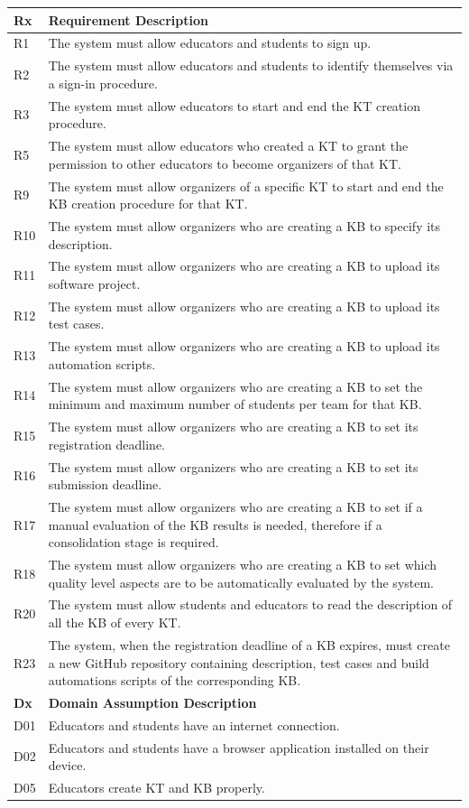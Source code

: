 \documentclass[11pt]{report}
\begin{document}
\begin{longtable}[h] {|p{10mm} p{130mm}|}
\hline
\textbf{Rx} & \textbf{Requirement Description} \\ \hline
R1 & The system must allow educators and students to sign up. \\
R2 & The system must allow educators and students to identify themselves via a sign-in procedure. \\ 
R3 & The system must allow educators to start and end the KT creation procedure.\\
R5 & The system must allow educators who created a KT to grant the permission to other educators to become organizers of that KT. \\ 
R9 & The system must allow organizers of a specific KT to start and end the KB creation procedure for that KT\@. \\
R10 & The system must allow organizers who are creating a KB to specify its description. \\ 
R11 & The system must allow organizers who are creating a KB to upload its software project. \\ 
R12 & The system must allow organizers who are creating a KB to upload its test cases. \\ 
R13 & The system must allow organizers who are creating a KB to upload its automation scripts. \\ 
R14 & The system must allow organizers who are creating a KB to set the minimum and maximum number of students per team for that KB. \\ 
R15 & The system must allow organizers who are creating a KB to set its registration deadline. \\ 
R16 & The system must allow organizers who are creating a KB to set its submission deadline. \\ 
R17 & The system must allow organizers who are creating a KB to set if a manual evaluation of the KB results is needed, therefore if a consolidation stage is required. \\ 
R18 & The system must allow organizers who are creating a KB to set which quality level aspects are to be automatically evaluated by the system. \\ 
R20 & The system must allow students and educators to read the description of all the KB of every KT. \\ 
R23 & The system, when the registration deadline of a KB expires, must create a new GitHub repository containing description, test cases and build automations scripts of the corresponding KB. \\ 
\hline
\textbf{Dx} & \textbf{Domain Assumption Description} \\ \hline
D01 & Educators and students have an internet connection. \\ 
D02 & Educators and students have a browser application installed on their device.  \\ 
D05 & Educators create KT and KB properly.  \\ \hline
\end{longtable}
\end{document}
